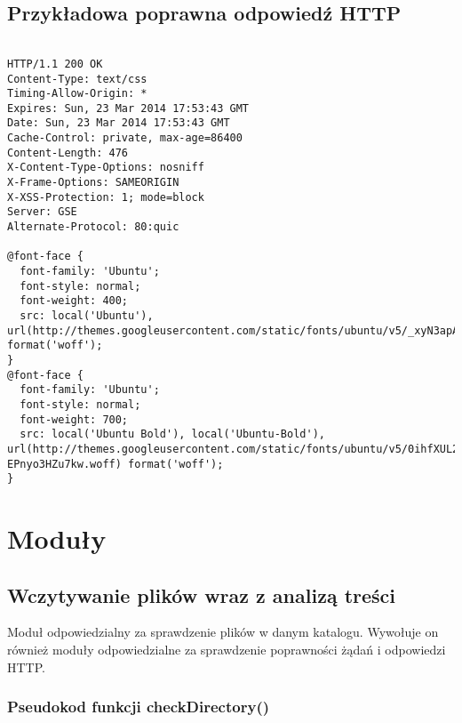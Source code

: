 \documentclass[a4paper,11pt]{report}
\begin{document}
\section{Przykładowa poprawna odpowiedź HTTP}

\begin{lstlisting}

HTTP/1.1 200 OK
Content-Type: text/css
Timing-Allow-Origin: *
Expires: Sun, 23 Mar 2014 17:53:43 GMT
Date: Sun, 23 Mar 2014 17:53:43 GMT
Cache-Control: private, max-age=86400
Content-Length: 476
X-Content-Type-Options: nosniff
X-Frame-Options: SAMEORIGIN
X-XSS-Protection: 1; mode=block
Server: GSE
Alternate-Protocol: 80:quic

@font-face {
  font-family: 'Ubuntu';
  font-style: normal;
  font-weight: 400;
  src: local('Ubuntu'), url(http://themes.googleusercontent.com/static/fonts/ubuntu/v5/_xyN3apAT_yRRDeqB3sPRg.woff) format('woff');
}
@font-face {
  font-family: 'Ubuntu';
  font-style: normal;
  font-weight: 700;
  src: local('Ubuntu Bold'), local('Ubuntu-Bold'), url(http://themes.googleusercontent.com/static/fonts/ubuntu/v5/0ihfXUL2emPh0ROJezvraD8E0i7KZn-EPnyo3HZu7kw.woff) format('woff');
}

\end{lstlisting}

\chapter{Moduły}

\section{Wczytywanie plików wraz z analizą treści}

Moduł odpowiedzialny za sprawdzenie plików w danym katalogu. Wywołuje on również moduły odpowiedzialne za sprawdzenie poprawności żądań i odpowiedzi HTTP.

\subsection{Pseudokod funkcji checkDirectory()}
\end{document}
